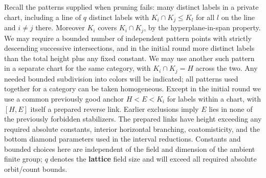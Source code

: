 \begin{convention}
Recall the patterns supplied when pruning fails: many distinct labels in a private chart, including a line of \(q\) distinct labels with \(K_i\cap K_j\le K_l\) for all \(l\) on the line and \(i\ne j\) there. Moreover \(K_i\) covers \(K_i\cap K_j\), by the hyperplane-in-span property. We may require a bounded number of independent pattern points with strictly descending successive intersections, and in the initial round more distinct labels than the total height plus any fixed constant. We may use another such pattern in a separate chart for the same category, with \(K_i\cap K_j=H\) across the two. Any needed bounded subdivision into colors will be indicated; all patterns used together for a category can be taken homogeneous. Except in the initial round we use a common previously good anchor \(H<E<K_i\) for labels within a chart, with \([H,E]\) itself a prepared reverse link. Earlier exclusions imply \(E\) lies in none of the previously forbidden stabilizers. The prepared links have height exceeding any required absolute constants, interior horizontal branching, coatomisticity, and the bottom diamond parameters used in the interval reductions. Constants and bounded choices here are independent of the field and dimension of the ambient finite group; \(q\) denotes the \textbf{lattice} field size and will exceed all required absolute orbit/count bounds.
\end{convention}

